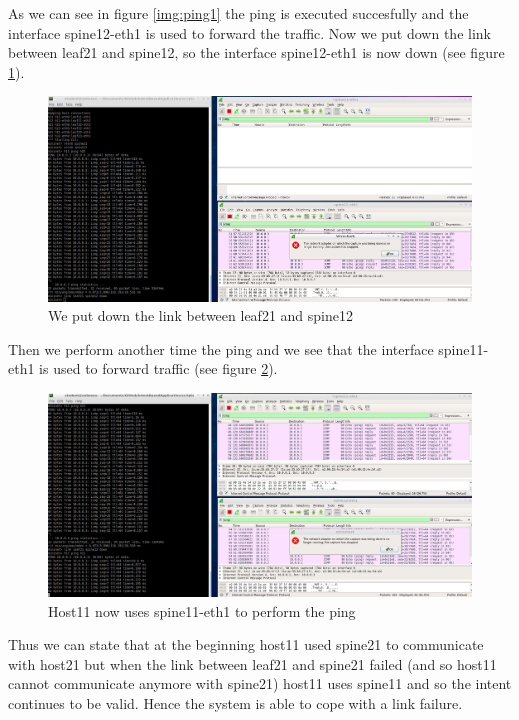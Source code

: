 \noindent As we can see in figure \ref{img:ping1} the ping is executed succesfully and the interface spine12-eth1 is used to forward the traffic. Now we put down the link between leaf21 and spine12, so the interface spine12-eth1 is now down (see figure \ref{img:linkdown}).

\begin{figure}[h]
	\centering
	\includegraphics[width=1\textwidth]{img/linkdown.png}
	\caption{We put down the link between leaf21 and spine12}
	\label{img:linkdown}
\end{figure}

\noindent Then we perform another time the ping and we see that the interface spine11-eth1 is used to forward traffic (see figure \ref{img:failurehandler}).

\begin{figure}[h]
	\centering
	\includegraphics[width=1\textwidth]{img/failurehandler.png}
	\caption{Host11 now uses spine11-eth1 to perform the ping}
	\label{img:failurehandler}
\end{figure}

\noindent Thus we can state that at the beginning host11 used spine21 to communicate with host21 but when the link between leaf21 and spine21 failed (and so host11 cannot communicate anymore with spine21) host11 uses spine11 and so the intent continues to be valid. Hence the system is able to cope with a link failure.


